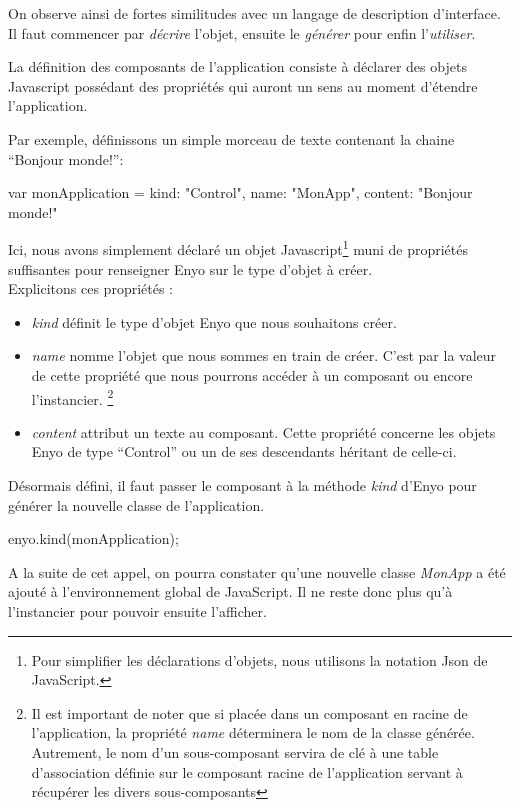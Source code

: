 \documentclass[11pt,a4paper]{report}
\begin{document}
On observe ainsi de fortes similitudes avec un langage de description d'interface.
Il faut commencer par \emph{décrire} l'objet, ensuite le \emph{générer} 
pour enfin l'\emph{utiliser}.

La définition des composants de l'application consiste à déclarer 
des objets Javascript possédant des propriétés qui auront un sens au moment d'étendre
l'application.\smallskip

Par exemple, définissons un simple morceau de texte contenant la chaine ``Bonjour monde!'':
\begin{JavaScript}
  var monApplication = {kind: "Control",
                        name: "MonApp",
                        content: "Bonjour monde!"}
\end{JavaScript}

Ici, nous avons simplement déclaré un objet Javascript\footnote{%
Pour simplifier les déclarations d'objets, nous utilisons la 
notation Json de JavaScript.}
muni de propriétés suffisantes pour renseigner Enyo sur le type d'objet à créer.\\
Explicitons ces propriétés :
\begin{itemize}
\item \emph{kind} définit le type d'objet Enyo que nous souhaitons créer.\smallskip
\item \emph{name} nomme l'objet que nous sommes en train de créer. C'est par la
valeur de cette propriété que nous pourrons accéder à un composant ou encore l'instancier.
\footnote{Il est important de noter que si placée dans un composant en racine de l'application,
la propriété \emph{name} déterminera le nom de la classe générée. Autrement, le nom d'un sous-composant
servira de clé à une table d'association définie sur le composant racine de l'application 
servant à récupérer les divers sous-composants
}\smallskip
\item \emph{content} attribut un texte au composant. Cette propriété concerne les objets Enyo de type 
``Control'' ou un de ses descendants héritant de celle-ci.\smallskip
\end{itemize}\medskip

Désormais défini, il faut passer le composant à la méthode \emph{kind} d'Enyo pour générer la nouvelle
classe de l'application.

\begin{JavaScript}
  enyo.kind(monApplication);
\end{JavaScript}

A la suite de cet appel, on pourra constater qu'une nouvelle classe \mbox{\emph{MonApp}} 
a été ajouté à l'environnement global de JavaScript. Il ne reste donc plus qu'à l'instancier 
pour pouvoir ensuite l'afficher.
\end{document}
